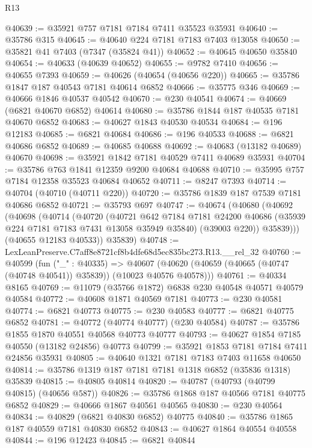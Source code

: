 \begin{lexlean}{R13}
\begin{coremodule}
@40639 := @35921 @757 @7181 @7184 @7411 @35523 @35931
@40640 := @35786 @315
@40645 := @40640 @224 @7181 @7183 @7403 @13058
@40650 := @35821 @41 @7403 (@7347 (@35824 @41))
@40652 := @40645 @40650 @35840
@40654 := @40633 (@40639 @40652)
@40655 := @9782 @7410
@40656 := @40655 @7393
@40659 := @40626 (@40654 (@40656 @220))
@40665 := @35786 @1847 @187 @40543 @7181 @40614 @6852
@40666 := @35775 @346
@40669 := @40666 @1846 @40537 @40542
@40670 := @230 @40541
@40674 := @40669 (@6821 @40670 @6852) @40614
@40680 := @35786 @1844 @187 @40535 @7181 @40670 @6852
@40683 := @40627 @1843 @40530 @40534
@40684 := @196 @12183
@40685 := @6821 @40684
@40686 := @196 @40533
@40688 := @6821 @40686 @6852
@40689 := @40685 @40688
@40692 := @40683 (@13182 @40689) @40670
@40698 := @35921 @1842 @7181 @40529 @7411 @40689 @35931
@40704 := @35786 @763 @1841 @12359 @9200 @40684 @40688
@40710 := @35995 @757 @7184 @12358 @35523 @40684 @40652
@40711 := @8247 @7393
@40714 := @40704 (@40710 (@40711 @220))
@40720 := @35786 @1839 @187 @7539 @7181 @40686 @6852
@40721 := @35793 @697
@40747 := @40674
    (@40680
      (@40692
        (@40698
          (@40714
            (@40720
              (@40721
                @642
                @7184
                @7181
                @24200
                @40686
                (@35939 @224 @7181 @7183 @7431 @13058 @35949 @35840)
                (@39003 @220))
              @35839)))
        (@40655 @12183 @40533))
      @35839)
@40748 := LexLeanPreserve.C7aff8e8721cf8b4dfe68d5ec835bc273.R13.__rel_32
@40760 := @40599
    (fun ("_" : @40335) =>
    @40607 (@40620 (@40659 (@40665 (@40747 (@40748 @40541)) @35839)) (@10023 @40576 @40578)))
@40761 := @40334 @8165
@40769 := @11079 (@35766 @1872) @6838 @230 @40548 @40571 @40579 @40584
@40772 := @40608 @1871 @40569 @7181
@40773 := @230 @40581
@40774 := @6821 @40773
@40775 := @230 @40583
@40777 := @6821 @40775 @6852
@40781 := @40772 (@40774 @40777) (@230 @40584)
@40787 := @35786 @1855 @1870 @40551 @40568 @40773 @40777
@40793 := @40627 @1854 @7185 @40550 (@13182 @24856) @40773
@40799 := @35921 @1853 @7181 @7184 @7411 @24856 @35931
@40805 := @40640 @1321 @7181 @7183 @7403 @11658 @40650
@40814 := @35786 @1319 @187 @7181 @7181 @1318 @6852 (@35836 @1318) @35839
@40815 := @40805 @40814
@40820 := @40787 (@40793 (@40799 @40815) (@40656 @587))
@40826 := @35786 @1868 @187 @40566 @7181 @40775 @6852
@40829 := @40666 @1867 @40561 @40565
@40830 := @230 @40564
@40834 := @40829 (@6821 @40830 @6852) @40775
@40840 := @35786 @1865 @187 @40559 @7181 @40830 @6852
@40843 := @40627 @1864 @40554 @40558
@40844 := @196 @12423
@40845 := @6821 @40844

\end{coremodule}
\end{lexlean}
